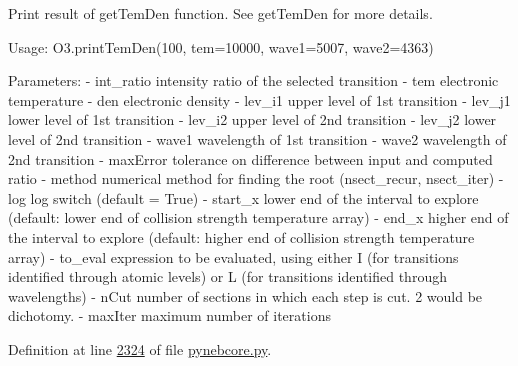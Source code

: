 \begin{DoxyVerb}Print result of getTemDen function. See getTemDen for more details.

Usage:
    O3.printTemDen(100, tem=10000, wave1=5007, wave2=4363)

Parameters:
    - int_ratio    intensity ratio of the selected transition
    - tem          electronic temperature
    - den          electronic density
    - lev_i1       upper level of 1st transition
    - lev_j1       lower level of 1st transition
    - lev_i2       upper level of 2nd transition
    - lev_j2       lower level of 2nd transition
    - wave1        wavelength of 1st transition
    - wave2        wavelength of 2nd transition
    - maxError     tolerance on difference between input and computed ratio 
    - method       numerical method for finding the root (nsect_recur, nsect_iter)
    - log          log switch (default = True)
    - start_x      lower end of the interval to explore (default: lower end of collision 
            strength temperature array)
    - end_x        higher end of the interval to explore (default: higher end of collision 
            strength temperature array)
    - to_eval      expression to be evaluated, using either I (for transitions identified through 
            atomic levels) or L (for transitions identified through wavelengths)
    - nCut        number of sections in which each step is cut. 2 would be dichotomy.
    - maxIter     maximum number of iterations\end{DoxyVerb}
 

Definition at line \hyperlink{pynebcore_8py_source_l02324}{2324} of file \hyperlink{pynebcore_8py_source}{pynebcore.\-py}.



